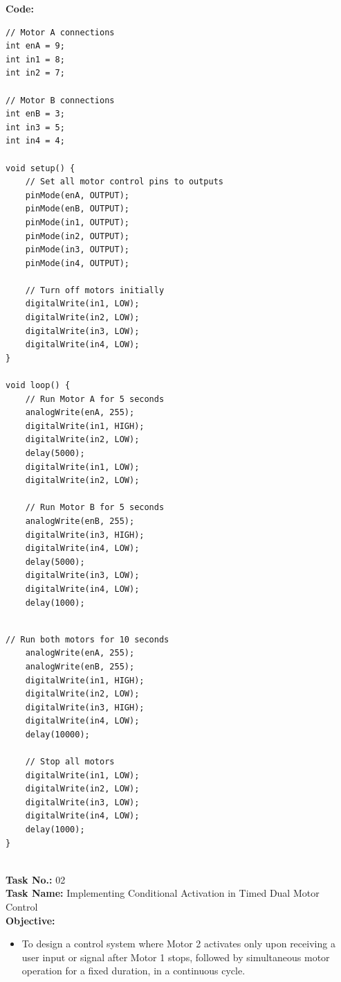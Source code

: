 \documentclass[a4paper,12pt]{article}
\begin{document}
	

	
\textbf{Code:}
\begin{lstlisting}[style=courier10, caption={Task 1 Arduino code}]
// Motor A connections
int enA = 9;
int in1 = 8;
int in2 = 7;

// Motor B connections
int enB = 3;
int in3 = 5;
int in4 = 4;

void setup() {
	// Set all motor control pins to outputs
	pinMode(enA, OUTPUT);
	pinMode(enB, OUTPUT);
	pinMode(in1, OUTPUT);
	pinMode(in2, OUTPUT);
	pinMode(in3, OUTPUT);
	pinMode(in4, OUTPUT);
	
	// Turn off motors initially
	digitalWrite(in1, LOW);
	digitalWrite(in2, LOW);
	digitalWrite(in3, LOW);
	digitalWrite(in4, LOW);
}

void loop() {
	// Run Motor A for 5 seconds
	analogWrite(enA, 255);
	digitalWrite(in1, HIGH);
	digitalWrite(in2, LOW);
	delay(5000);
	digitalWrite(in1, LOW);
	digitalWrite(in2, LOW);
	
	// Run Motor B for 5 seconds
	analogWrite(enB, 255);
	digitalWrite(in3, HIGH);
	digitalWrite(in4, LOW);
	delay(5000);
	digitalWrite(in3, LOW);
	digitalWrite(in4, LOW);
	delay(1000);
	
	\end{lstlisting}
	
	\begin{lstlisting}[style=courier10, caption={Task 1 Arduino code}]
	// Run both motors for 10 seconds
	analogWrite(enA, 255);
	analogWrite(enB, 255);
	digitalWrite(in1, HIGH);
	digitalWrite(in2, LOW);
	digitalWrite(in3, HIGH);
	digitalWrite(in4, LOW);
	delay(10000);
	
	// Stop all motors
	digitalWrite(in1, LOW);
	digitalWrite(in2, LOW);
	digitalWrite(in3, LOW);
	digitalWrite(in4, LOW);
	delay(1000);
}


\end{lstlisting}

	\textbf{	Task No.:} 02 \\
	\textbf{	Task Name:} Implementing Conditional Activation in Timed Dual Motor Control\\
	
	\textbf{Objective:}
	
	
	\begin{itemize}
		\item To design a control system where Motor 2 activates only upon receiving a user input or
		signal after Motor 1 stops, followed by simultaneous motor operation for a fixed duration,
		in a continuous cycle.
		
	\end{itemize}
	
\end{document}
